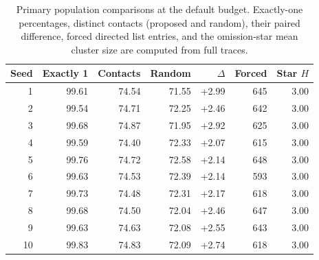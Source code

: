 \begin{table}[tb]\centering\small
\caption{Primary population comparisons at the default budget. Exactly-one percentages, distinct contacts (proposed and random), their paired difference, forced directed list entries, and the omission-star mean cluster size are computed from full traces.}\label{tab:seeds}
\begin{tabular}{@{}rrrrrrr@{}}\toprule
Seed & Exactly 1 & Contacts & Random & $\Delta$ & Forced & Star $H$ \\ \midrule
1 & 99.61 & 74.54 & 71.55 & +2.99 & 645 & 3.00 \\
2 & 99.54 & 74.71 & 72.25 & +2.46 & 642 & 3.00 \\
3 & 99.68 & 74.87 & 71.95 & +2.92 & 625 & 3.00 \\
4 & 99.59 & 74.40 & 72.33 & +2.07 & 615 & 3.00 \\
5 & 99.76 & 74.72 & 72.58 & +2.14 & 648 & 3.00 \\
6 & 99.63 & 74.53 & 72.39 & +2.14 & 593 & 3.00 \\
7 & 99.73 & 74.48 & 72.31 & +2.17 & 618 & 3.00 \\
8 & 99.68 & 74.50 & 72.04 & +2.46 & 647 & 3.00 \\
9 & 99.63 & 74.63 & 72.08 & +2.55 & 643 & 3.00 \\
10 & 99.83 & 74.83 & 72.09 & +2.74 & 618 & 3.00 \\
\bottomrule\end{tabular}\end{table}

